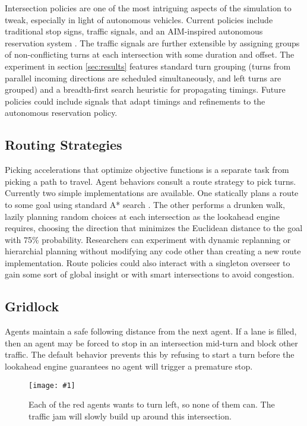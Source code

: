 \documentclass[letterpaper, 10 pt, conference]{ieeeconf}  %
\newcommand{\pix}[3]{
  \begin{figure}[h]
    \centering \texttt{[image: \#1]}
    \caption{#2}
  \end{figure}
}
\begin{document}
Intersection policies are one of the most intriguing aspects of the simulation
to tweak, especially in light of autonomous vehicles. Current policies include
traditional stop signs, traffic signals, and an AIM-inspired autonomous
reservation system \cite{JAIR08-dresner}. The traffic signals are further
extensible by assigning groups of non-conflicting turns at each intersection
with some duration and offset. The experiment in section \ref{sec:results}
features standard turn grouping (turns from parallel incoming directions are
scheduled simultaneously, and left turns are grouped) and a breadth-first search
heuristic for propagating timings. Future policies could include signals that
adapt timings and refinements to the autonomous reservation policy.

\subsection{Routing Strategies}

Picking accelerations that optimize objective functions is a separate task from
picking a path to travel. Agent behaviors consult a route strategy to pick
turns. Currently two simple implementations are available. One statically plans
a route to some goal using standard A* search \cite{astar}. The other performs a
drunken walk, lazily planning random choices at each intersection as the
lookahead engine requires, choosing the direction that minimizes the Euclidean
distance to the goal with 75\% probability. Researchers can experiment with
dynamic replanning or hierarchial planning without modifying any code other than
creating a new route implementation. Route policies could also interact with a
singleton overseer to gain some sort of global insight or with smart
intersections to avoid congestion.

\subsection{Gridlock}

Agents maintain a safe following distance from the next agent. If a lane is
filled, then an agent may be forced to stop in an intersection mid-turn and
block other traffic. The default behavior prevents this by refusing to start a
turn before the lookahead engine guarantees no agent will trigger a premature
stop.

\pix{gridlock.png}{Each of the red agents wants to turn left, so none of them
can. The traffic jam will slowly build up around this intersection.}{scale=0.25}
\end{document}
